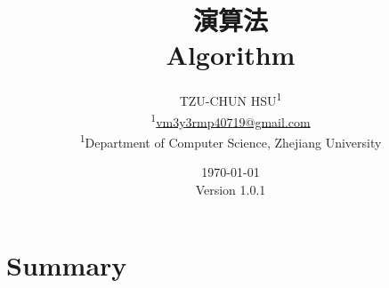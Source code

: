 \documentclass[12pt]{article}
\newcommand{\ver}{\textmd{Version} 1.0.1} %
\begin{document}
\title{\Huge{\textbf{演算法}} \\
	\LARGE{\textbf{Algorithm}}
}
\newcommand*{\affaddr}[1]{#1}
\newcommand*{\affmark}[1][*]{\textsuperscript{#1}}
\author{
	TZU-CHUN HSU\affmark[1] \\
	\affmark[1]\href{mailto:vm3y3rmp40719@gmail.com}{vm3y3rmp40719@gmail.com} \\
	\affaddr{\affmark[1]Department of Computer Science, Zhejiang University
	}
}

\date{\mbox{}\vfill\today\\ \ver}

\maketitle
\pagebreak



\begingroup
\section{Summary}
\begin{enumerate}
\let\clearpage\relax





% 

\end{enumerate}
\endgroup

\end{document}
